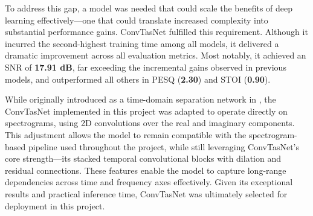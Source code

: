 To address this gap, a model was needed that could scale the benefits of deep learning effectively—one that could translate increased complexity into substantial performance gains. ConvTasNet fulfilled this requirement. Although it incurred the second-highest training time among all models, it delivered a dramatic improvement across all evaluation metrics. Most notably, it achieved an SNR of \textbf{17.91 dB}, far exceeding the incremental gains observed in previous models, and outperformed all others in PESQ (\textbf{2.30}) and STOI (\textbf{0.90}).

While originally introduced as a time-domain separation network in \cite{luo2019conv}, the ConvTasNet implemented in this project was adapted to operate directly on spectrograms, using 2D convolutions over the real and imaginary components. This adjustment allows the model to remain compatible with the spectrogram-based pipeline used throughout the project, while still leveraging ConvTasNet’s core strength—its stacked temporal convolutional blocks with dilation and residual connections. These features enable the model to capture long-range dependencies across time and frequency axes effectively. Given its exceptional results and practical inference time, ConvTasNet was ultimately selected for deployment in this project.